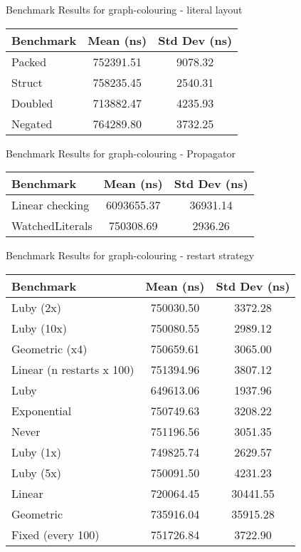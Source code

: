 \begin{cmptable}[h]{Benchmark Results for graph-colouring - literal layout\label{tab:bench-graph-colouring---literal-layout}}
    \begin{tabular}{|l|c|c|}
        \hline
        Benchmark & Mean (ns) & Std Dev (ns) \\
        \hline
        Packed & 752391.51 & 9078.32 \\
        Struct & 758235.45 & 2540.31 \\
        Doubled & 713882.47 & 4235.93 \\
        Negated & 764289.80 & 3732.25 \\
        \hline
    \end{tabular}
\end{cmptable}


\begin{cmptable}[h]{Benchmark Results for graph-colouring - Propagator\label{tab:bench-graph-colouring---Propagator}}
    \begin{tabular}{|l|c|c|}
        \hline
        Benchmark & Mean (ns) & Std Dev (ns) \\
        \hline
        Linear checking & 6093655.37 & 36931.14 \\
        WatchedLiterals & 750308.69 & 2936.26 \\
        \hline
    \end{tabular}
\end{cmptable}


\begin{cmptable}[h]{Benchmark Results for graph-colouring - restart strategy\label{tab:bench-graph-colouring---restart-strategy}}
    \begin{tabular}{|l|c|c|}
        \hline
        Benchmark & Mean (ns) & Std Dev (ns) \\
        \hline
        Luby (2x) & 750030.50 & 3372.28 \\
        Luby (10x) & 750080.55 & 2989.12 \\
        Geometric (x4) & 750659.61 & 3065.00 \\
        Linear (n restarts x 100) & 751394.96 & 3807.12 \\
        Luby & 649613.06 & 1937.96 \\
        Exponential & 750749.63 & 3208.22 \\
        Never & 751196.56 & 3051.35 \\
        Luby (1x) & 749825.74 & 2629.57 \\
        Luby (5x) & 750091.50 & 4231.23 \\
        Linear & 720064.45 & 30441.55 \\
        Geometric & 735916.04 & 35915.28 \\
        Fixed (every 100) & 751726.84 & 3722.90 \\
        \hline
    \end{tabular}
\end{cmptable}

